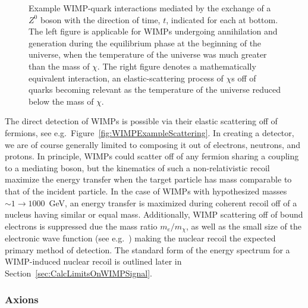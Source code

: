 			\begin{figure}
				\centering
				\def\figheight{0.4\textwidth}
				\caption[Relevant WIMP-quark interactions during hot and cold universe epochs.]{Example WIMP-quark 
				interactions mediated by the exchange of a $Z^{0}$ boson with the direction
				of time, $t$, indicated for each at bottom.  The left figure is applicable for WIMPs undergoing annihilation and 
				generation during the equilibrium phase at
				the beginning of the universe, when the temperature of the universe was much greater than the mass of $\chi$.
				The right figure denotes a mathematically equivalent interaction, an elastic-scattering process
				of $\chi$s off of quarks becoming relevant as the temperature of the universe reduced below the mass of $\chi$.}
				\label{fig:WIMPExample}
			\end{figure}	
			
	The direct detection of WIMPs is possible via their elastic scattering off of fermions, see e.g.~Figure~\ref{fig:WIMPExampleScattering}.  In creating a detector, we are of course generally limited to composing it out of electrons, neutrons, and protons.  In principle, WIMPs could scatter off of any fermion sharing a coupling to a mediating boson, but the kinematics of such a non-relativistic recoil maximize the energy transfer when the target particle has mass comparable to that of the incident particle.  In the case of WIMPs with hypothesized masses $\sim1\to1000$~GeV, an energy transfer is maximized during coherent recoil off of a nucleus having similar or equal mass.  Additionally, WIMP scattering off of bound electrons is suppressed due the mass ratio $m_{e}/m_{\chi}$, as well as the small size of the electronic wave function (see e.g.~\cite{Kopp09}) making the nuclear recoil the expected primary method of detection.  The standard form of the energy spectrum for a WIMP-induced nuclear recoil is outlined later in Section~\ref{sec:CalcLimitsOnWIMPSignal}.
	
			\subsubsection{Axions}
			\label{sec:AxionsAsDM}
	
